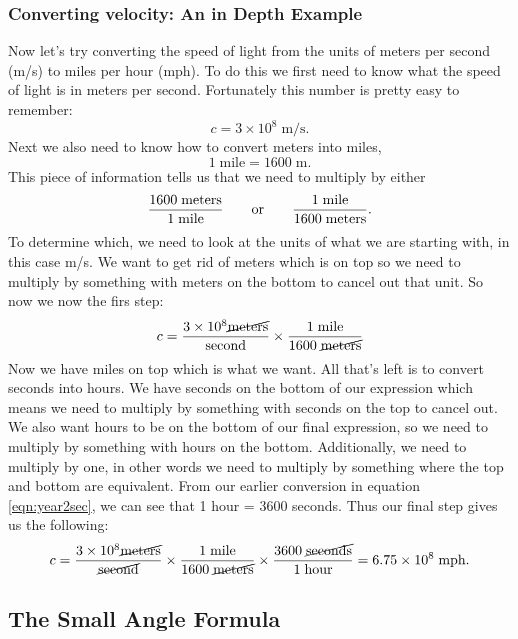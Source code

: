 	\subsubsection*{Converting velocity: An in Depth Example}
	Now let's try converting the speed of light from the units of meters per second (m/s) to miles per hour (mph). To do this we first need to know what the speed of light is in meters per second. Fortunately this number is pretty easy to remember:
	$$c=3\times10^8\;\textrm{m/s}.$$
	Next we also need to know how to convert meters into miles,
	$$1\;\textrm{mile}=1600\;\textrm{m}.$$
	This piece of information tells us that we need to multiply by either
	$$\dfrac{1600\; {\rm meters}}{1\; {\rm mile}} \qquad {\rm or} \qquad \dfrac{1\; {\rm mile}}{1600\; {\rm meters}}.$$
To determine which, we need to look at the units of what we are starting with, in this case m/s. We want to get rid of meters which is on top so we need to multiply by something with meters on the bottom to cancel out that unit. So now we now the firs step:
	$$c=\dfrac{3\times 10^8 \cancel{\rm meters}}{\rm second}\times \dfrac{1\; {\rm mile}}{1600\; \cancel{{\rm meters}}}$$
	Now we have miles on top which is what we want. All that's left is to convert seconds into hours. We have seconds on the bottom of our expression which means we need to multiply by something with seconds on the top to cancel out. We also want hours to be on the bottom of our final expression, so we need to multiply by something with hours on the bottom. Additionally, we need to multiply by one, in other words we need to multiply by something where the top and bottom are equivalent. From our earlier conversion in equation \ref{eqn:year2sec}, we can see that 1 hour = 3600 seconds. Thus our final step gives us the following:
	$$c=\dfrac{3\times 10^8 \cancel{\rm meters}}{\cancel{\rm second}}\times \dfrac{1\; {\rm mile}}{1600\; \cancel{{\rm meters}}}\times\dfrac{3600\;\cancel{\textrm{seconds}}}{1\;\textrm{hour}}=6.75\times10^8\;\textrm{mph}.$$
	
\subsection*{The Small Angle Formula}
